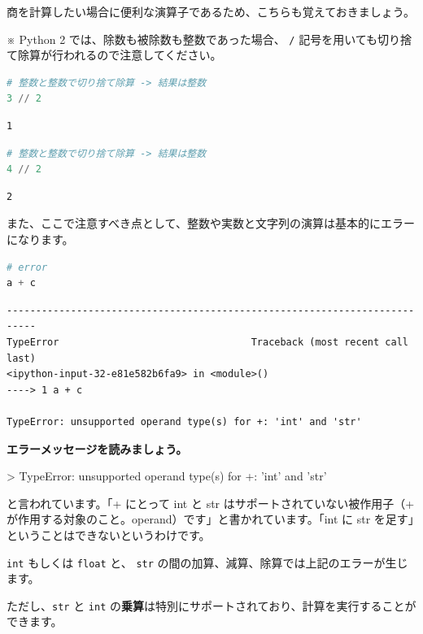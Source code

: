 商を計算したい場合に便利な演算子であるため、こちらも覚えておきましょう。


※ Python 2 では、除数も被除数も整数であった場合、 \texttt{/} 記号を用いても切り捨て除算が行われるので注意してください。


\begin{lstlisting}[style=codecell,language=Python]
# 整数と整数で切り捨て除算 -> 結果は整数
3 // 2
\end{lstlisting}

\begin{lstlisting}[style=outputcell]
1
\end{lstlisting}

\begin{lstlisting}[style=codecell,language=Python]
# 整数と整数で切り捨て除算 -> 結果は整数
4 // 2
\end{lstlisting}

\begin{lstlisting}[style=outputcell]
2
\end{lstlisting}

また、ここで注意すべき点として、整数や実数と文字列の演算は基本的にエラーになります。


\begin{lstlisting}[style=codecell,language=Python]
# error
a + c
\end{lstlisting}

\begin{lstlisting}[style=outputcell]
---------------------------------------------------------------------------
TypeError                                 Traceback (most recent call last)
<ipython-input-32-e81e582b6fa9> in <module>()
----> 1 a + c

TypeError: unsupported operand type(s) for +: 'int' and 'str'
\end{lstlisting}

\textbf{エラーメッセージを読みましょう。}


> TypeError: unsupported operand type(s) for +: 'int' and 'str'


と言われています。「+ にとって int と str はサポートされていない被作用子（+ が作用する対象のこと。operand）です」と書かれています。「int に str を足す」ということはできないというわけです。


\texttt{int} もしくは \texttt{float} と、 \texttt{str} の間の加算、減算、除算では上記のエラーが生じます。

ただし、\texttt{str} と \texttt{int} の\textbf{乗算}は特別にサポートされており、計算を実行することができます。


